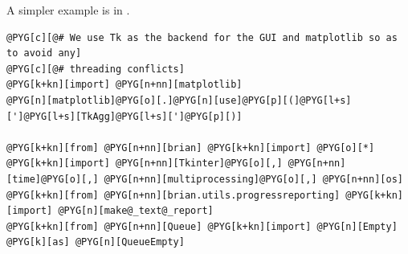 \documentclass[letterpaper,10pt,english]{manual}
\begin{document}
A simpler example is in .

\begin{Verbatim}[commandchars=@\[\]]
@PYG[c][@# We use Tk as the backend for the GUI and matplotlib so as to avoid any]
@PYG[c][@# threading conflicts]
@PYG[k+kn][import] @PYG[n+nn][matplotlib]
@PYG[n][matplotlib]@PYG[o][.]@PYG[n][use]@PYG[p][(]@PYG[l+s][']@PYG[l+s][TkAgg]@PYG[l+s][']@PYG[p][)]

@PYG[k+kn][from] @PYG[n+nn][brian] @PYG[k+kn][import] @PYG[o][*]
@PYG[k+kn][import] @PYG[n+nn][Tkinter]@PYG[o][,] @PYG[n+nn][time]@PYG[o][,] @PYG[n+nn][multiprocessing]@PYG[o][,] @PYG[n+nn][os]
@PYG[k+kn][from] @PYG[n+nn][brian.utils.progressreporting] @PYG[k+kn][import] @PYG[n][make@_text@_report]
@PYG[k+kn][from] @PYG[n+nn][Queue] @PYG[k+kn][import] @PYG[n][Empty] @PYG[k][as] @PYG[n][QueueEmpty]


\end{Verbatim}
\end{document}
